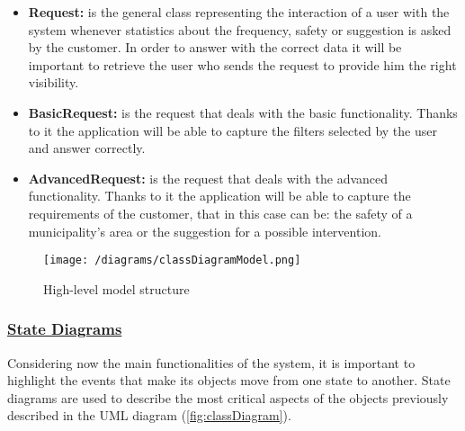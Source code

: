 \begin{itemize}
		\item \textbf{Request:} is the general class representing the interaction of a user with the system whenever statistics about the frequency, safety or suggestion is asked by the customer. In order to answer with the correct data it will be important to retrieve the user who sends the request to provide him the right visibility.
		
		\item \textbf{BasicRequest:} is the request that deals with the basic functionality. Thanks to it the application will be able to capture the filters selected by the user and answer correctly.
		
		\item \textbf{AdvancedRequest:} is the request that deals with the advanced functionality. Thanks to it the application will be able to capture the requirements of the customer, that in this case can be: the safety of a municipality's area or the suggestion for a possible intervention.
	\end{itemize}
	
	\begin{figure}[h!]
		\centering
		\texttt{[image: /diagrams/classDiagramModel.png]}
		\caption{\label{fig:classDiagram}High-level model structure}
	\end{figure}

	\FloatBarrier
	
	\subsubsection[State Diagrams]{\hyperlink{toc}{State Diagrams}}
	Considering now the main functionalities of the system, it is important to highlight the events that make its objects move from one state to another. State diagrams are used to describe the most critical aspects of the objects previously described in the UML diagram (\autoref{fig:classDiagram}).
	
